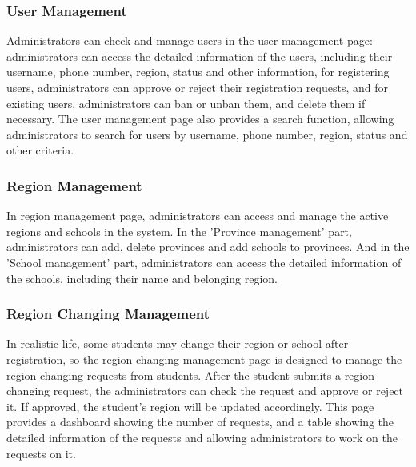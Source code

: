 \documentclass[12pt]{article}
\begin{document}
\subsubsection{User Management}
Administrators can check and manage users in the user management page: administrators can access the detailed information of
the users, including their username, phone number, region, status and other information,
for registering users, administrators can approve or reject their registration requests, and for existing users, administrators can ban or unban them,
and delete them if necessary.
The user management page also provides a search function, allowing administrators to search for users by username, phone number, region,
status and other criteria.
\subsubsection{Region Management}
In region management page, administrators can access and manage the active regions and schools in the system. In the 'Province management'
part, administrators can add, delete provinces and add schools to provinces. And in the 'School management' part, administrators can
access the detailed information of the schools, including their name and belonging region.
\subsubsection{Region Changing Management}
In realistic life, some students may change their region or school after registration, so the region changing management page is designed to
manage the region changing requests from students. After the student submits a region changing request,
the administrators can check the request and approve or reject it. If approved, the student's region will be updated accordingly.
This page provides a dashboard showing the number of requests, and a table showing the detailed information of the requests
and allowing administrators to work on the requests on it.
\end{document}
